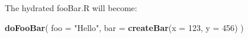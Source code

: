 \documentclass[]{article}
\newenvironment{Shaded}{\begin{snugshade}}{\end{snugshade}}
\newcommand{\DataTypeTok}[1]{\textcolor[rgb]{0.13,0.29,0.53}{#1}}
\newcommand{\DecValTok}[1]{\textcolor[rgb]{0.00,0.00,0.81}{#1}}
\newcommand{\KeywordTok}[1]{\textcolor[rgb]{0.13,0.29,0.53}{\textbf{#1}}}
\newcommand{\NormalTok}[1]{#1}
\newcommand{\StringTok}[1]{\textcolor[rgb]{0.31,0.60,0.02}{#1}}
\begin{document}
The hydrated fooBar.R will become:

\begin{Shaded}
\begin{Highlighting}[]
\KeywordTok{doFooBar}\NormalTok{(}
  \DataTypeTok{foo =} \StringTok{"Hello"}\NormalTok{,}
  \DataTypeTok{bar =} \KeywordTok{createBar}\NormalTok{(}\DataTypeTok{x =} \DecValTok{123}\NormalTok{,}
                  \DataTypeTok{y =} \DecValTok{456}\NormalTok{)}
\NormalTok{)}
\end{Highlighting}
\end{Shaded}
\end{document}
